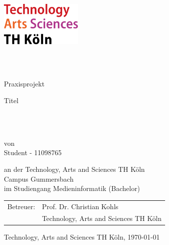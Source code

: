 
\begin{titlepage}

\begin{center}

\includegraphics[width=0.3\textwidth]{images/TH_Koeln_Logo.png}\\

\vspace*{1cm}

\HRULE \\
\vspace*{-0.6cm}
\HRule \\

	\begin{Huge}
	Praxisprojekt\\
	\end{Huge}
	
	\begin{huge}
    	Titel
	\end{huge}
    
\HRule \\
\vspace*{-0.54cm}
\HRULE \\

\vspace*{1.5cm}

\begin{large}
	von\\
    Student - 11098765\\
        
\vspace{1.0cm}
	
	an der Technology, Arts and Sciences TH Köln\\
    Campus Gummersbach\\
    im Studiengang Medieninformatik (Bachelor)\\
    
\vspace{1.0cm}

    \begin{tabular}{rl}
        Betreuer:  &  Prof. Dr. Christian Kohls\\
       			   &  \small Technology, Arts and Sciences TH Köln \\[1.0em]
       
	\end{tabular}
    
\end{large}

\vspace{1.5cm}

Technology, Arts and Sciences TH Köln, \today \\

 
\vfill
\end{center}

\end{titlepage}